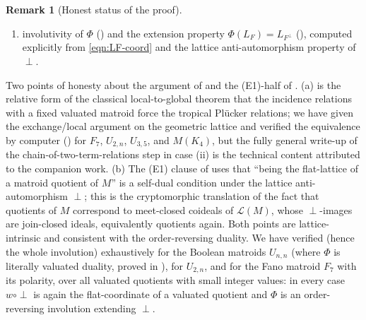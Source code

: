 \documentclass{article}
\theoremstyle{definition}
\newtheorem{remark}[theorem]{Remark}
\newcommand{\cLL}{\mathcal{L}}
\begin{document}
\begin{remark}[Honest status of the proof]
\begin{enumerate}
where the existence of $\perp$ is essential and explains why no analogous duality is expected for
matroids whose lattice admits no order-reversing involution;
\item involutivity of $\Phi$ () and the extension property $\Phi(L_F)=L_{F^{\perp}}$
(), computed explicitly from \eqref{eqn:LF-coord} and the lattice anti-automorphism
property of $\perp$.
\end{enumerate}
Two points of honesty about the argument of  and the (E1)-half of
. (a)  is the relative form of the classical local-to-global
theorem that the incidence relations with a fixed valuated matroid force the tropical Pl\"ucker
relations; we have given the exchange/local argument on the geometric lattice and verified the
equivalence by computer () for $F_7$, $U_{2,n}$, $U_{3,5}$, and $M(K_4)$, but the
fully general write-up of the chain-of-two-term-relations step in case (ii) is the technical content
attributed to the companion work. (b) The (E1) clause of  uses that ``being the
flat-lattice of a matroid quotient of $M$'' is a self-dual condition under the lattice
anti-automorphism $\perp$; this is the cryptomorphic translation of the fact that quotients of $M$
correspond to meet-closed coideals of $\cLL(M)$, whose $\perp$-images are join-closed ideals,
equivalently quotients again. Both points are lattice-intrinsic and consistent with the order-reversing
duality. We have verified  (hence the whole involution) exhaustively for the Boolean
matroids $U_{n,n}$ (where $\Phi$ is literally valuated duality, proved in
), for $U_{2,n}$, and for the Fano
matroid $F_7$ with its polarity, over all valuated quotients with small integer values: in every case
$w\circ\perp$ is again the flat-coordinate of a valuated quotient and $\Phi$ is an order-reversing
involution extending $\perp$.
\end{remark}
\end{document}
